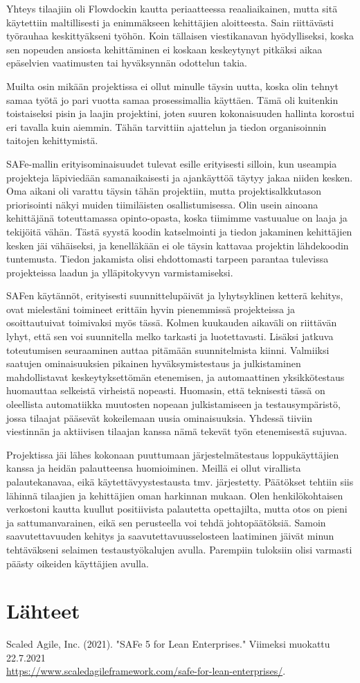 \documentclass[11pt]{article}
\begin{document}
Yhteys tilaajiin oli Flowdockin kautta periaatteessa reaaliaikainen, mutta sitä
käytettiin maltillisesti ja enimmäkseen kehittäjien aloitteesta. Sain
riittävästi työrauhaa keskittyäkseni työhön. Koin tällaisen viestikanavan
hyödylliseksi, koska sen nopeuden ansiosta kehittäminen ei koskaan keskeytynyt
pitkäksi aikaa epäselvien vaatimusten tai hyväksynnän odottelun takia.

Muilta osin mikään projektissa ei ollut minulle täysin uutta, koska olin tehnyt
samaa työtä jo pari vuotta samaa prosessimallia käyttäen. Tämä oli kuitenkin
toistaiseksi pisin ja laajin projektini, joten suuren kokonaisuuden
hallinta korostui eri tavalla kuin aiemmin. Tähän tarvittiin
ajattelun ja tiedon organisoinnin taitojen kehittymistä.

SAFe-mallin erityisominaisuudet tulevat esille erityisesti silloin, kun
useampia projekteja läpiviedään samanaikai\-sesti ja ajankäyttöä täytyy jakaa
niiden kesken. Oma aikani oli varat\-tu täysin tähän projektiin, mutta
projektisalkkutason priorisointi näkyi muiden tiimiläisten osallistumisessa. Olin
usein ainoana kehittäjänä toteuttamassa opinto-opasta, koska tii\-mim\-me vastuualue on laaja ja
tekijöitä vähän. Tästä syystä koodin katselmointi ja tiedon jakaminen
kehittäjien kesken jäi vähäiseksi, ja kenelläkään ei ole täysin kattavaa
projektin lähdekoodin tuntemusta. Tiedon jakamista olisi
ehdottomasti tarpeen parantaa tulevissa projekteissa laadun ja ylläpitokyvyn
varmistamiseksi.

SAFen käytännöt, erityisesti suunnittelupäivät ja lyhytsyklinen ketterä kehitys,
ovat mieles\-täni toi\-mineet erittäin hyvin pienemmissä projekteissa ja
osoittautuivat toimivaksi myös tässä. Kolmen kuukauden aikaväli on riittävän
lyhyt, että sen voi suunnitella melko tarkasti ja luotettavasti. Lisäksi jatkuva
toteutumisen seuraaminen auttaa pitämään suunnitelmista kiinni. Valmiik\-si
saatu\-jen omi\-naisuuksien pi\-kai\-nen hyväksymistestaus ja julkistaminen mahdollistavat
keskeytyksettömän ete\-nemisen, ja automaattinen yksikkötestaus huomauttaa selkeistä
virheistä nopeasti. Huomasin, että teknisesti tässä on oleellista
automatiikka muutosten nopeaan julkistamiseen ja testausympäristö, jossa tilaajat
pää\-sevät kokeilemaan uusia ominaisuuksia. Yhdessä tiiviin viestinnän ja
aktiivisen tilaa\-jan kanssa nämä teke\-vät työn etenemisestä sujuvaa.

Projektissa jäi lähes kokonaan puuttumaan järjestelmätestaus
loppukäyttäjien kanssa ja heidän pa\-lautteensa huomioiminen. Meillä ei ollut
virallista palautekanavaa, eikä käy\-tettä\-vyystestaus\-ta tmv. järjestetty. Päätökset
tehtiin siis lähinnä tilaajien ja kehittäjien oman harkinnan mukaan. Olen
henkilökohtaisen verkostoni kautta kuullut positiivista palautetta opettajilta,
mutta otos on pieni ja sattumanvarainen, eikä sen perusteella voi tehdä
joh\-topäätöksiä. Samoin saavutettavuuden kehitys ja saavutettavuusselosteen
laatiminen jäi\-vät minun tehtäväkseni selai\-men testaustyökalujen avulla.
Parempiin tuloksiin olisi varmasti päästy oikeiden käyttäjien avulla.

\section{Lähteet}

Scaled Agile, Inc. (2021). "SAFe 5 for Lean Enterprises." Viimeksi muokattu 22.7.2021
\\ \url{https://www.scaledagileframework.com/safe-for-lean-enterprises/}.
\end{document}
